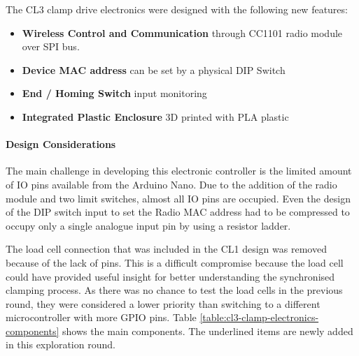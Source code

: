 The CL3 clamp drive electronics were designed with the following new features:

\begin{itemize}[nosep]
    \item \textbf{Wireless Control and Communication} through CC1101 radio module over SPI bus. 
    \item \textbf{Device MAC address} can be set by a physical DIP Switch
    \item \textbf{End / Homing Switch} input monitoring 
    \item \textbf{Integrated Plastic Enclosure} 3D printed with PLA plastic
\end{itemize}

\paragraph{Design Considerations}

The main challenge in developing this electronic controller is the limited amount of IO pins available from the Arduino Nano. Due to the addition of the radio module and two limit switches, almost all IO pins are occupied. Even the design of the DIP switch input to set the Radio MAC address had to be compressed to occupy only a single analogue input pin by using a resistor ladder. \parencite{chrisPerfectMultibuttonInput2018}

The load cell connection that was included in the CL1 design was removed because of the lack of pins. This is a difficult compromise because the load cell could have provided useful insight for better understanding the synchronised clamping process. As there was no chance to test the load cells in the previous round, they were considered a lower priority than switching to a different microcontroller with more GPIO pins.
Table \ref{table:cl3-clamp-electronics-components} shows the main components. The underlined items are newly added in this exploration round. 

